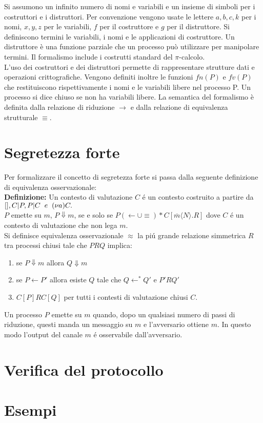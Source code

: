 \documentclass[12pt]{report}
\begin{document}
Si assumono un infinito numero di nomi e variabili e un insieme di simboli per i costruttori e i distruttori. Per convenzione vengono usate le lettere $a, b, c, k$ per i nomi, $x, y, z$ per le variabili, $f$ per il costruttore e $g$ per il distruttore. Si definiscono termini le variabili, i nomi e le applicazioni di costruttore. Un distruttore è una funzione parziale che un processo può utilizzare per manipolare termini. Il formalismo include i costrutti standard del $\pi$-calcolo.\\
L'uso dei costruttori e dei distruttori permette di rappresentare strutture dati e operazioni crittografiche. Vengono definiti inoltre le funzioni $fn(P)$ e $fv(P)$ che restituiscono rispettivamente i nomi e le variabili libere nel processo P. Un processo si dice chiuso se non ha variabili libere. La semantica del formalismo è definita dalla relazione di riduzione $ \xrightarrow{} $ e dalla relazione di equivalenza strutturale $ \equiv$.
\section*{Segretezza forte}
Per formalizzare il concetto di segretezza forte si passa dalla seguente definizione di equivalenza osservazionale:\\
\textbf{Definizione:}  Un contesto di valutazione $C$ é un contesto costruito a partire da $[], C | P, P|C \hspace{2mm}e\hspace{2mm} (\nu a)C.$\\
$P$ emette su $m$, $P \Downarrow m$, se e solo se $P (\leftarrow \cup \equiv)* C[\overline{m}\langle N \rangle.R]$ dove $C$ é un contesto di valutazione che non lega $m$.\\
Si definisce equivalenza osservazionale $\approx$ la piú grande relazione simmetrica $R$ tra processi chiusi tale che $PRQ$ implica:\\
\begin{enumerate}
    \item se $P \Downarrow m$ allora $Q \Downarrow m$
    \item se $P \leftarrow P'$ allora esiste $Q$ tale che $Q \leftarrow^* Q'$ e $P'RQ'$
    \item $C[P]RC[Q]$ per tutti i contesti di valutazione chiusi $C$.
\end{enumerate}
Un processo $P$ emette su $m$ quando, dopo un qualsiasi numero di passi di riduzione, questi manda un messaggio su $m$ e l'avversario ottiene $m$. In questo modo l'output del canale $m$ é osservabile dall'avversario.
\section*{Verifica del protocollo}
\section*{Esempi}
\end{document}
